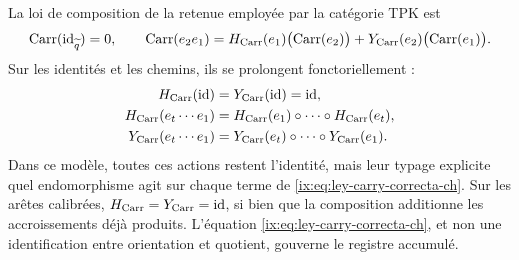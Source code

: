 La loi de composition de la retenue employée par la catégorie TPK est
\begin{equation}
 \operatorname{Carr}(\operatorname{id}_{\widetilde q})=0,\qquad
 \operatorname{Carr}(e_2e_1)
 =H_{\rm Carr}(e_1)\bigl(\operatorname{Carr}(e_2)\bigr)
  +Y_{\rm Carr}(e_2)\bigl(\operatorname{Carr}(e_1)\bigr).
 \label{ix:eq:ley-carry-correcta-ch}
\end{equation}
Sur les identités et les chemins, ils se prolongent fonctoriellement :
\[
\begin{aligned}
 H_{\rm Carr}(\operatorname{id})
   &=Y_{\rm Carr}(\operatorname{id})=\operatorname{id},\\
 H_{\rm Carr}(e_t\cdots e_1)
   &=H_{\rm Carr}(e_1)\circ\cdots\circ H_{\rm Carr}(e_t),\\
 Y_{\rm Carr}(e_t\cdots e_1)
   &=Y_{\rm Carr}(e_t)\circ\cdots\circ Y_{\rm Carr}(e_1).
\end{aligned}
\]
Dans ce modèle, toutes ces actions restent l'identité, mais leur typage explicite quel endomorphisme agit sur chaque terme de \eqref{ix:eq:ley-carry-correcta-ch}.
Sur les arêtes calibrées, \(H_{\rm Carr}=Y_{\rm Carr}=\operatorname{id}\), si bien que la composition additionne les accroissements déjà produits. L'équation \eqref{ix:eq:ley-carry-correcta-ch}, et non une identification entre orientation et quotient, gouverne le registre accumulé.

